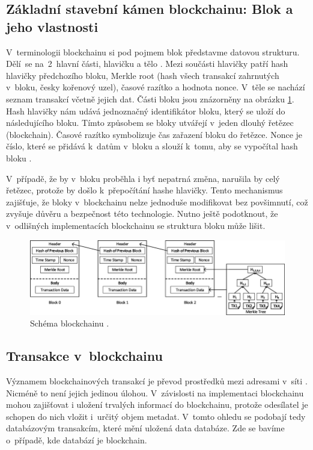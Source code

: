 \subsection{Základní stavební kámen blockchainu: Blok a jeho vlastnosti}
V~terminologii blockchainu si pod pojmem blok představme datovou strukturu. Dělí~se na~2~hlavní části, hlavičku a tělo \cite{blok}. Mezi součásti hlavičky patří hash hlavičky předchozího bloku, Merkle root (hash všech transakcí zahrnutých v~bloku, česky kořenový uzel), časové razítko a hodnota nonce. V~těle se nachází seznam transakcí včetně jejich dat. Části bloku jsou znázorněny na obrázku \ref{fig:blok}. Hash hlavičky nám udává jednoznačný identifikátor bloku, který se uloží do následujícího bloku. Tímto způsobem se bloky utvářejí v~jeden dlouhý řetězec (blockchain). Časové razítko symbolizuje čas zařazení bloku do řetězce. Nonce je číslo, které se přidává k~datům v~bloku a slouží k~tomu, aby se vypočítal hash bloku  \cite{Bitcoin_block}. 

V~případě, že by v~bloku proběhla i byť nepatrná změna, narušila by celý řetězec, protože by došlo k~přepočítání hashe hlavičky. Tento mechanismus zajišťuje, že bloky v~blockchainu nelze jednoduše modifikovat bez povšimnutí, což zvyšuje důvěru a bezpečnost této technologie. Nutno ještě podotknout, že v~odlišných implementacích blockchainu se struktura bloku může lišit.

\begin{figure}
\centering
\includegraphics[width=\textwidth]{obrazky/block.png}
\caption{Schéma blockchainu \cite{Schema}.}
\label{fig:blok}
\centering
\end{figure}

\subsection{Transakce v~blockchainu}
Významem blockchainových transakcí je převod prostředků mezi adresami v~síti \cite{Bashir2017}. Nicméně to není jejich jedinou úlohou. V~závislosti na implementaci blockchainu mohou zajišťovat i uložení trvalých informací do blockchainu, protože odesílatel je schopen do nich vložit i~určitý objem metadat. V~tomto ohledu se podobají tedy databázovým transakcím, které mění uložená data databáze. Zde se bavíme o~případě, kde databází je blockchain. 

